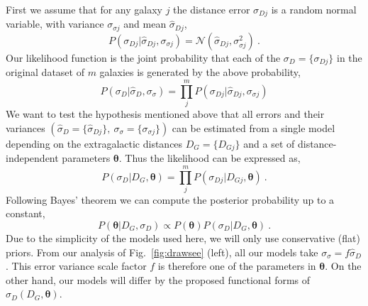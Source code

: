 \documentclass[a4paper,fleqn,usenatbib]{mnras}
\begin{document}
First we assume that for any galaxy $j$ the distance error $\sigma_{Dj}$ is a random normal variable, with variance $\sigma_{\sigma j}$ and mean $\hat{\sigma}_{Dj}$, 
\begin{equation}
P(\sigma_{Dj}|\hat{\sigma}_{Dj},\sigma_{\sigma j})=\mathcal{N}(\hat{\sigma}_{Dj},\sigma_{\sigma j}^2)\ .
	\label{eq:prob}
\end{equation}
Our likelihood function is the joint probability that each of the $\sigma_D=\{\sigma_{Dj}\}$ in the original dataset of $m$ galaxies is generated by the above probability,  
\begin{equation}
 P(\sigma_{D}|\hat{\sigma}_{D},\sigma_{\sigma})=\prod_j^mP(\sigma_{Dj}|\hat{\sigma}_{Dj},\sigma_{\sigma j})
\end{equation}
We want to test the hypothesis mentioned above that all errors and their variances $(\hat{\sigma}_D=\{\hat{\sigma}_{Dj}\},\ \sigma_\sigma=\{\sigma_{\sigma j}\})$ can be estimated from a single model depending on the extragalactic distances $D_G=\{D_{Gj}\}$ and a set of distance-independent parameters $\pmb{\theta}$. Thus the likelihood can be expressed as,
\[P(\sigma_D|D_G,\pmb{\theta})=\prod_j^mP(\sigma_{Dj}|D_{Gj},\pmb{\theta})\ .\]
Following Bayes' theorem we can compute the posterior probability up to a constant,
\begin{equation}
P(\pmb{\theta}|D_G,\sigma_D)\propto P(\pmb{\theta})P(\sigma_D|D_G,\pmb{\theta})\ .
	\label{eq:ppd}
\end{equation}
Due to the simplicity of the models used here, we will only use conservative (flat) priors. From our analysis of Fig.~\ref{fig:drawsee} (left), all our models take $\sigma_\sigma=f\hat{\sigma}_D$. This error variance scale factor $f$ is therefore one of the parameters in $\pmb{\theta}$. On the other hand, our models will differ by the proposed functional forms of $\hat{\sigma}_D(D_G,\pmb{\theta})$.\\
\end{document}
